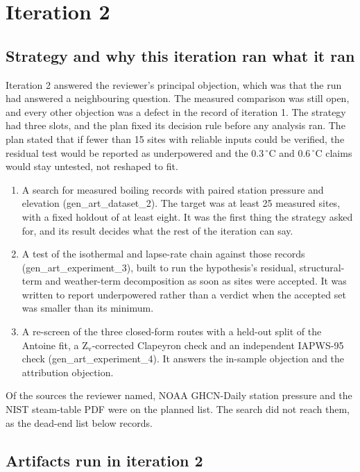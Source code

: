 \documentclass[11pt,letterpaper]{article}
\begin{document}
\section{Iteration 2}

\subsection{Strategy and why this iteration ran what it ran}

Iteration 2 answered the reviewer's principal objection, which was that the run had answered a neighbouring question. The measured comparison was still open, and every other objection was a defect in the record of iteration 1. The strategy had three slots, and the plan fixed its decision rule before any analysis ran. The plan stated that if fewer than 15 sites with reliable inputs could be verified, the residual test would be reported as underpowered and the 0.3\,$^\circ$C and 0.6\,$^\circ$C claims would stay untested, not reshaped to fit.

\begin{enumerate}
\item A search for measured boiling records with paired station pressure and elevation (gen\_art\_dataset\_2). The target was at least 25 measured sites, with a fixed holdout of at least eight. It was the first thing the strategy asked for, and its result decides what the rest of the iteration can say.
\item A test of the isothermal and lapse-rate chain against those records (gen\_art\_experiment\_3), built to run the hypothesis's residual, structural-term and weather-term decomposition as soon as sites were accepted. It was written to report underpowered rather than a verdict when the accepted set was smaller than its minimum.
\item A re-screen of the three closed-form routes with a held-out split of the Antoine fit, a Z$_\mathrm{v}$-corrected Clapeyron check and an independent IAPWS-95 check (gen\_art\_experiment\_4). It answers the in-sample objection and the attribution objection.
\end{enumerate}

Of the sources the reviewer named, NOAA GHCN-Daily station pressure and the NIST steam-table PDF were on the planned list. The search did not reach them, as the dead-end list below records.

\subsection{Artifacts run in iteration 2}
\end{document}
